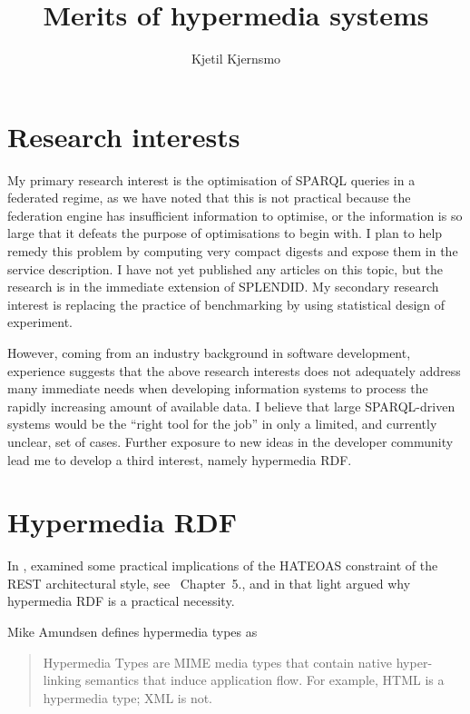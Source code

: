 \documentclass{article}
\title{Merits of hypermedia systems}
\author{Kjetil Kjernsmo}
\begin{document}
\maketitle

\section{Research interests}

My primary research interest is the optimisation of SPARQL queries in
a federated regime, as we have noted that this is not practical
because the federation engine has insufficient information to
optimise, or the information is so large that it defeats the purpose
of optimisations to begin with. I plan to help remedy this problem by
computing very compact digests and expose them in the service
description. I have not yet published any articles on this topic, but
the research is in the immediate extension of
SPLENDID\cite{splendid}. My secondary research interest is replacing
the practice of benchmarking by using statistical design of
experiment. 

However, coming from an industry background in software development,
experience suggests that the above research interests does not
adequately address many immediate needs when developing information
systems to process the rapidly increasing amount of available data. I
believe that large SPARQL-driven systems would be the ``right tool for
the job'' in only a limited, and currently unclear, set of
cases. Further exposure to new ideas in the developer community lead
me to develop a third interest, namely hypermedia RDF. 

\section{Hypermedia RDF}

In \cite{kjernsmo_lapis_2012}, examined some practical implications of
the HATEOAS constraint of the REST architectural style, see
\cite{Fielding_2000_Architectural-Styles}~Chapter~5., and in that
light argued why hypermedia RDF is a practical necessity.

Mike Amundsen defines hypermedia types\cite{hypermediatypes} as 
\begin{quote}
Hypermedia Types are MIME media types that contain native
hyper-linking semantics that induce application flow. For example,
HTML is a hypermedia type; XML is not.
\end{quote}
\end{document}
